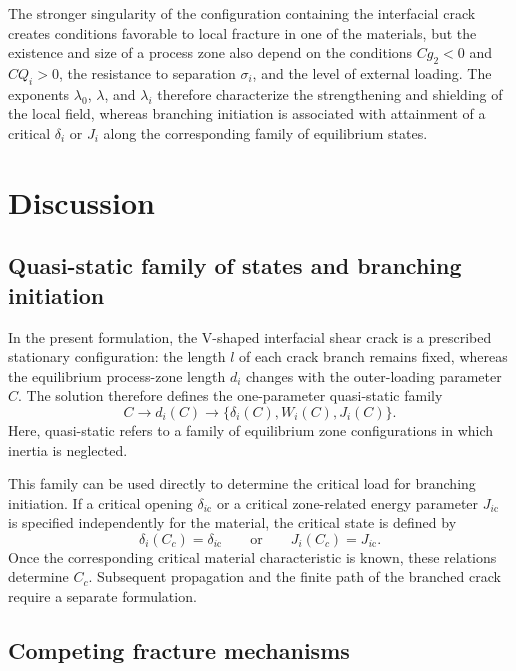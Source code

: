\documentclass[pdflatex,onecolumn,sn-mathphys-ay]{sn-jnl}
\begin{document}
The stronger singularity of the configuration containing the interfacial
crack creates conditions favorable to local fracture in one of the
materials, but the existence and size of a process zone also depend on
the conditions $Cg_2<0$ and $CQ_i>0$, the resistance to separation
$\sigma_i$, and the level of external loading. The exponents
$\lambda_0$, $\lambda$, and $\lambda_i$ therefore characterize the
strengthening and shielding of the local field, whereas branching
initiation is associated with attainment of a critical $\delta_i$ or
$J_i$ along the corresponding family of equilibrium states.


\section{Discussion}
\label{sec:discussion}

\subsection{Quasi-static family of states and branching initiation}
\label{subsec:discussion-quasistatic}

In the present formulation, the V-shaped interfacial shear crack is a
prescribed stationary configuration: the length $l$ of each crack branch
remains fixed, whereas the equilibrium process-zone length $d_i$ changes
with the outer-loading parameter $C$. The solution therefore defines the
one-parameter quasi-static family
\begin{equation*}
  C\longrightarrow d_i(C)
  \longrightarrow
  \bigl\{\delta_i(C),W_i(C),J_i(C)\bigr\}.
\end{equation*}
Here, quasi-static refers to a family of equilibrium zone configurations
in which inertia is neglected.

This family can be used directly to determine the critical load for
branching initiation. If a critical opening $\delta_{i\mathrm{c}}$ or a
critical zone-related energy parameter $J_{i\mathrm{c}}$ is specified
independently for the material, the critical state is defined by
\begin{equation*}
  \delta_i(C_c)=\delta_{i\mathrm{c}}
  \qquad\text{or}\qquad
  J_i(C_c)=J_{i\mathrm{c}}.
\end{equation*}
Once the corresponding critical material characteristic is known, these
relations determine $C_c$. Subsequent propagation and the finite path of
the branched crack require a separate formulation.

\subsection{Competing fracture mechanisms}
\label{subsec:discussion-competing}
\end{document}

